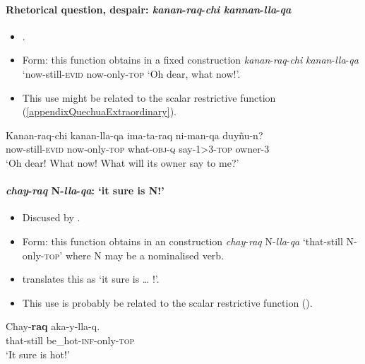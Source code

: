 \paragraph{Rhetorical question, despair: \textit{kanan}-\textit{raq}-\textit{chi} \textit{kannan}-\textit{lla}-\textit{qa}}
\begin{itemize}
	\item \textcite[446–447]{Weber1989}.
	\item Form: this function obtains in a fixed construction \textit{kanan}-\textit{raq}-\textit{chi} \textit{kanan}-\textit{lla}-\textit{qa} \lq now-still-\textsc{evid} now-only-\textsc{top} \lq Oh dear, what now!'. 
	\item This use might be related to the scalar restrictive function (\ref{appendixQuechuaExtraordinary}).
\end{itemize}

\begin{exe}
	\ex
	\gll Kanan-raq-chi kanan-lla-qa ima-ta-raq ni-man-qa duyñu-n?\\
	now-still-\textsc{evid} now-only-\textsc{top} what-\textsc{obj}-\textsc{q} say-1>3-\textsc{top} owner-3\\
	\glt \lq Oh dear! What now! What will its owner say to me?\rq{ }\parencite[447]{Weber1989}
\end{exe}


\paragraph{\textit{chay}-\textit{raq} N-\textit{lla}-\textit{qa}: \lq it sure is N!'}
\begin{itemize}
	\item Discused by \textcite[446]{Weber1989}.
	\item Form: this function obtains in an construction \textit{chay}-\textit{raq} N-\textit{lla}-\textit{qa} \lq that-still N-only-\textsc{top}' where N may be a nominalised verb.
	\item \textcite[446]{Weber1989} translates this as \lq it sure is … !'.
	\item This use is probably be related to the scalar restrictive function ().
\end{itemize}

\begin{exe}
	\ex
	\gll Chay-\textbf{raq} aka-y-lla-q.\\
	that-still be\_hot-\textsc{inf}-only-\textsc{top}\\
	\glt \lq It sure is hot!' \parencite[446]{Weber1989}
\end{exe}

